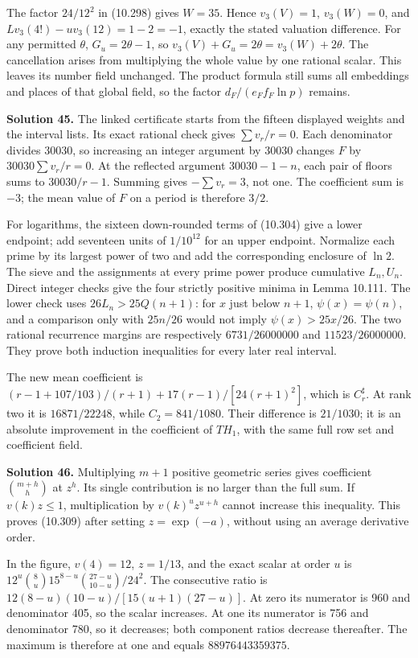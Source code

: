 \documentclass[
  11pt,
  a4paper,
]{article}
\begin{document}
The factor \(24/12^2\) in (10.298) gives \(W=35\). Hence \(v_3(V)=1\),
\(v_3(W)=0\), and \(Lv_3(4!)-uv_3(12)=1-2=-1\), exactly the stated
valuation difference. For any permitted \(\theta\), \(G_u=2\theta-1\),
so \(v_3(V)+G_u=2\theta=v_3(W)+2\theta\). The cancellation arises from
multiplying the whole value by one rational scalar. This leaves its
number field unchanged. The product formula still sums all embeddings
and places of that global field, so the factor \(d_F/(e_Ff_F\ln p)\)
remains.

\textbf{Solution 45.} The linked certificate starts from the fifteen
displayed weights and the interval lists. Its exact rational check gives
\(\sum v_r/r=0\). Each denominator divides 30030, so increasing an
integer argument by 30030 changes \(F\) by \(30030\sum v_r/r=0\). At the
reflected argument \(30030-1-n\), each pair of floors sums to
\(30030/r-1\). Summing gives \(-\sum v_r=3\), not one. The coefficient
sum is \(-3\); the mean value of \(F\) on a period is therefore \(3/2\).

For logarithms, the sixteen down-rounded terms of (10.304) give a lower
endpoint; add seventeen units of \(1/10^{12}\) for an upper endpoint.
Normalize each prime by its largest power of two and add the
corresponding enclosure of \(\ln2\). The sieve and the assignments at
every prime power produce cumulative \(L_n,U_n\). Direct integer checks
give the four strictly positive minima in Lemma 10.111. The lower check
uses \(26L_n>25Q(n+1)\): for \(x\) just below \(n+1\),
\(\psi(x)=\psi(n)\), and a comparison only with \(25n/26\) would not
imply \(\psi(x)>25x/26\). The two rational recurrence margins are
respectively \(6731/26000000\) and \(11523/26000000\). They prove both
induction inequalities for every later real interval.

The new mean coefficient is \((r-1+107/103)/(r+1)+17(r-1)/[24(r+1)^2]\),
which is \(C_r^{\sharp}\). At rank two it is \(16871/22248\), while
\(C_2=841/1080\). Their difference is \(21/1030\); it is an absolute
improvement in the coefficient of \(TH_1\), with the same full row set
and coefficient field.

\textbf{Solution 46.} Multiplying \(m+1\) positive geometric series
gives coefficient \(\binom{m+h}{h}\) at \(z^h\). Its single contribution
is no larger than the full sum. If \(v(k)z\le1\), multiplication by
\(v(k)^uz^{u+h}\) cannot increase this inequality. This proves (10.309)
after setting \(z=\exp(-a)\), without using an average derivative order.

In the figure, \(v(4)=12\), \(z=1/13\), and the exact scalar at order
\(u\) is \(12^u\binom8u15^{8-u}\binom{27-u}{10-u}/24^2\). The
consecutive ratio is \(12(8-u)(10-u)/[15(u+1)(27-u)]\). At zero its
numerator is 960 and denominator 405, so the scalar increases. At one
its numerator is 756 and denominator 780, so it decreases; both
component ratios decrease thereafter. The maximum is therefore at one
and equals \(88976443359375\).
\end{document}
